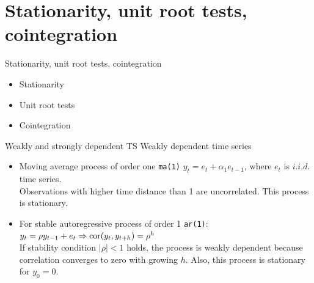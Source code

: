 \documentclass{beamer}
\begin{document}
\section{Stationarity, unit root tests, cointegration}
\begin{frame}{Stationarity, unit root tests, cointegration}
  \begin{itemize}
      \item Stationarity
      \bigskip
      \item Unit root tests
      \bigskip
      \item Cointegration
  \end{itemize}  
\end{frame}
\begin{frame}{Weakly and strongly dependent TS}
Weakly dependent time series
  \vspace{0.4cm}
\begin{itemize}
  \item Moving average process of order one \texttt{ma(1)} $y_t=e_t+\alpha_1 e_{t-1}$, where $e_t$ is $\textit{i.i.d.}$ time series. \\Observations with higher time distance than 1 are uncorrelated. This process is stationary.
  \vspace{0.7cm}
  \item For stable autoregressive process of order 1 \texttt{ar(1)}: \\ \smallskip
  $y_t = \rho y_{t-1} + e_t \Rightarrow \textnormal{cor}(y_t,y_{t+h})=\rho^h$\\
  \vspace{0.4cm}
  If stability condition $|\rho|<1$  holds, the process is weakly dependent because correlation converges to zero with growing $h$. Also, this process is stationary for $y_0 =0$.
  \vspace{0.4cm}
\end{itemize}
\end{frame}
\end{document}
